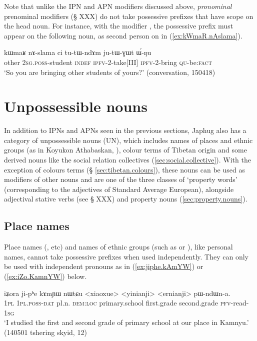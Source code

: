 Note that unlike the IPN and APN modifiers discussed above, \textit{pronominal} prenominal modifiers (§ XXX) do not take possessive prefixes that have scope on the head noun. For instance, with the modifier , the possessive prefix must appear on the following noun, as second person  on  in (\ref{ex:kWmaR.nAslama}).

\begin{exe}
\ex \label{ex:kWmaR.nAslama}
 \gll  kɯmaʁ nɤ-slama ci tu-tɯ-ndɤm ju-tɯ-ɣɯt ɯ́-ŋu \\
 other \textsc{2sg}.\textsc{poss}-student \textsc{indef} \textsc{ipfv}-2-take[III] \textsc{ipfv}-2-bring \textsc{qu}-be:\textsc{fact} \\
 \glt `So you are bringing other students of yours?' (conversation, 150418)
\end{exe}

 

\section{Unpossessible nouns} \label{sec:unpossessible.nouns}
In addition to IPNs and APNs seen in the previous sections, Japhug also has a category of unpossessible nouns (UN), which includes names of places and ethnic groups (as in Koyukon Athabaskan, \citealt[651]{thompson96koyukon}), colour terms of Tibetan origin and some derived nouns like the social relation collectives (\ref{sec:social.collective}). With the exception of colours terms (§ \ref{sec:tibetan.colours}), these nouns can be used as modifiers of other nouns and are one of the three classes of `property words' (corresponding to the adjectives of Standard Average European),  alongside adjectival stative verbs (see § XXX) and property nouns (\ref{sec:property.nouns}).

 

\subsection{Place names}  \label{sec:place.names}
Place names (,  etc) and names of ethnic groups (such as  or ), like personal names, cannot take possessive prefixes when used independently. They can only be used with independent pronouns as in (\ref{ex:jiphe.kAmYW}) or (\ref{ex:iZo.KamnYW}) below.

\begin{exe}
\ex \label{ex:jiphe.kAmYW}
\gll   iʑora ji-pʰe kɤmɲɯ nɯtɕu <xiaoxue> <yinianji> <ernianji> pɯ-ndɯn-a. \\
\textsc{1pl} \textsc{1pl}.\textsc{poss}-\textsc{dat} pl.n. \textsc{dem}:\textsc{loc} primary.school first.grade second.grade \textsc{pfv}-read-\textsc{1sg} \\
\glt `I studied the first and second grade of primary school at our place in Kamnyu.' (140501 tshering skyid, 12)
\end{exe}

